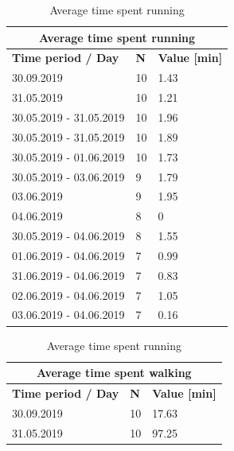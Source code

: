 \begin{table}[]
	\parbox{.45\linewidth}{
		\centering
		\begin{tabular}{|l|l|l|}
			\hline
			\multicolumn{3}{|c|}{\textbf{Average time spent running}}          \\ \hline
			\textbf{Time period / Day} & \textbf{N} & \textbf{Value {[}min{]}} \\ \hline
			30.09.2019                 & 10         & 1.43                     \\ \hline
			31.05.2019                 & 10         & 1.21                     \\ \hline
			30.05.2019 - 31.05.2019    & 10         & 1.96                     \\ \hline
			30.05.2019 - 31.05.2019    & 10         & 1.89                     \\ \hline
			30.05.2019 - 01.06.2019    & 10         & 1.73                     \\ \hline
			30.05.2019 - 03.06.2019    & 9          & 1.79                     \\ \hline
			03.06.2019                 & 9          & 1.95                     \\ \hline
			04.06.2019                 & 8          & 0                        \\ \hline
			30.05.2019 - 04.06.2019    & 8          & 1.55                     \\ \hline
			01.06.2019 - 04.06.2019    & 7          & 0.99                     \\ \hline
			31.06.2019 - 04.06.2019    & 7          & 0.83                     \\ \hline
			02.06.2019 - 04.06.2019    & 7          & 1.05                     \\ \hline
			03.06.2019 - 04.06.2019    & 7          & 0.16                     \\ \hline
		\end{tabular}
		\label{results-running}
		\caption{Average time spent running}
	}
	\hfill
	\parbox{.45\linewidth}{
		\centering
		\begin{tabular}{|l|l|l|}
			\hline
			\multicolumn{3}{|c|}{\textbf{Average time spent walking}}          \\ \hline
			\textbf{Time period / Day} & \textbf{N} & \textbf{Value {[}min{]}} \\ \hline
			30.09.2019                 & 10         & 17.63                    \\ \hline
			31.05.2019                 & 10         & 97.25                    \\ \hline

\end{tabular}}
\end{table}
